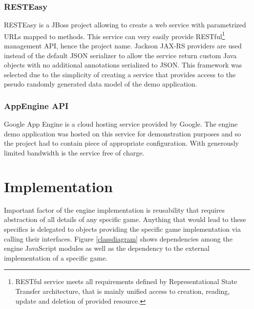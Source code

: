 \documentclass[11pt,oneside, final]{fithesis2}
\begin{document}
\subsection{RESTEasy}
RESTEasy is a JBoss project allowing to create a web service with parametrized URLs mapped to methods\cite{resteasy}. This service can very easily  provide RESTful\footnote{RESTful service meets all requirements defined by Representational State Transfer architecture, that is mainly unified access to creation, reading, update and deletion of provided resource\cite{fielding}.} management API, hence the project name. Jackson JAX-RS providers\cite{jackson} are used instead of the default JSON serializer to allow the service return custom Java objects with no additional annotations serialized to JSON. This framework was selected due to the simplicity of creating a service that provides access to the pseudo randomly generated data model of the demo application.

\subsection{AppEngine API}
Google App Engine is a cloud hosting service provided by Google. The engine demo application was hosted on this service for demonstration purposes and so the project had to contain piece of appropriate configuration. With generously limited bandwidth is the service free of charge. \cite{appengine}

\chapter{Implementation}
\label{implementation}
Important factor of the engine implementation is reusability that requires abstraction of all details of any specific game. Anything that would lead to these specifics is delegated to objects providing the specific game implementation via calling their interfaces. Figure \ref{classdiagram} shows dependencies among the engine JavaScript modules as well as the dependency to the external implementation of a specific game.
\end{document}
